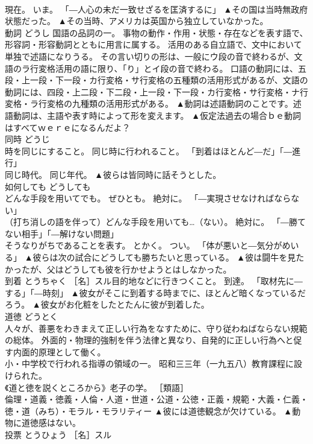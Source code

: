 \documentclass[8pt]{extreport}
\begin{document}
\begin{CJK}{UTF8}{min}
\\	現在。 いま。 「―人心の未だ一致せざるを匡済するに」	▲その国は当時無政府状態だった。 ▲その当時、アメリカは英国から独立していなかった。
\\	動詞	どうし	国語の品詞の一。 事物の動作・作用・状態・存在などを表す語で、形容詞・形容動詞とともに用言に属する。 活用のある自立語で、文中において単独で述語になりうる。 その言い切りの形は、一般にウ段の音で終わるが、文語のラ行変格活用の語に限り、「り」とイ段の音で終わる。 口語の動詞には、五段・上一段・下一段・カ行変格・サ行変格の五種類の活用形式があるが、文語の動詞には、四段・上二段・下二段・上一段・下一段・カ行変格・サ行変格・ナ行変格・ラ行変格の九種類の活用形式がある。	▲動詞は述語動詞のことです。述語動詞は、主語や表す時によって形を変えます。 ▲仮定法過去の場合ｂｅ動詞はすべてｗｅｒｅになるんだよ？
\\	同時	どうじ	
\\	時を同じにすること。 同じ時に行われること。 「到着はほとんど―だ」「―進行」 
\\	同じ時代。 同じ年代。	▲彼らは皆同時に話そうとした。
\\	如何しても	どうしても	
\\	どんな手段を用いてでも。 ぜひとも。 絶対に。 「―実現させなければならない」 
\\	（打ち消しの語を伴って）どんな手段を用いても…（ない）。 絶対に。 「―勝てない相手」「―解けない問題」 
\\	そうなりがちであることを表す。 とかく。 つい。 「体が悪いと―気分がめいる」	▲彼らは次の試合にどうしても勝ちたいと思っている。 ▲彼は闘牛を見たかったが、父はどうしても彼を行かせようとはしなかった。
\\	到着	とうちゃく	［名］スル目的地などに行きつくこと。 到達。 「取材先に―する」「―時刻」	▲彼女がそこに到着する時までに、ほとんど暗くなっているだろう。 ▲彼女がお化粧をしたとたんに彼が到着した。
\\	道徳	どうとく	
\\	人々が、善悪をわきまえて正しい行為をなすために、守り従わねばならない規範の総体。 外面的・物理的強制を伴う法律と異なり、自発的に正しい行為へと促す内面的原理として働く。 
\\	小・中学校で行われる指導の領域の一。 昭和三三年（一九五八）教育課程に設けられた。 
\\	《道と徳を説くところから》老子の学。 ［類語］
\\	倫理・道義・徳義・人倫・人道・世道・公道・公徳・正義・規範・大義・仁義・徳・道（みち）・モラル・モラリティー	▲彼には道徳観念が欠けている。 ▲動物に道徳感はない。
\\	投票	とうひょう	［名］スル 

\end{CJK}
\end{document}
